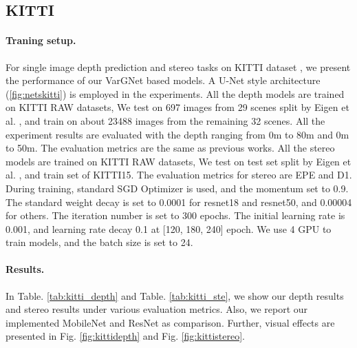 \documentclass{article}
\begin{document}
\subsection{KITTI}
\paragraph{Traning setup.} For single image depth prediction and stereo tasks on KITTI dataset \cite{geiger2013vision}, we present the performance of our VarGNet based models. A U-Net style architecture (\ref{fig:netskitti}) is employed in the experiments.
All the depth models are trained on KITTI RAW datasets, We test on 697 images from 29 scenes split by Eigen et al. \cite{eigen2014depth}, and train on about 23488 images from the remaining 32 scenes. All the experiment results are evaluated with the depth ranging from 0m to 80m and 0m to 50m. The evaluation metrics are the same as previous works. 
All the stereo models are trained on KITTI RAW datasets, We test on test set split by Eigen et al. \cite{eigen2014depth}, and train set of KITTI15. The evaluation metrics for stereo are EPE and D1.
During training, standard SGD Optimizer is used, and the momentum set to 0.9. The standard weight decay is set to 0.0001 for resnet18 and resnet50, and 0.00004 for others. The iteration number is set to 300 epochs. The initial learning rate is 0.001, and learning rate decay 0.1 at [120, 180, 240] epoch. We use 4 GPU to train models, and the batch size is set to 24.

\paragraph{Results.} In Table. \ref{tab:kitti_depth} and Table. \ref{tab:kitti_ste}, we show our depth results and stereo results under various evaluation metrics. Also, we report our implemented MobileNet and ResNet as comparison. Further, visual effects are presented in Fig. \ref{fig:kittidepth} and Fig. \ref{fig:kittistereo}.
\end{document}
